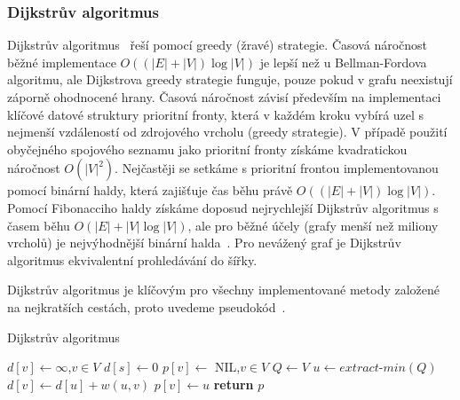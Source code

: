 \documentclass{bakalarka}
\begin{document}
\subsubsection{Dijkstrův algoritmus}
Dijkstrův algoritmus~\citep{dijkstra1959} řeší  pomocí greedy (žravé) strategie. Časová náročnost běžné implementace
$O((|E| + |V|)\log|V|)$ je lepší než u Bellman-Fordova algoritmu, ale
Dijkstrova greedy strategie funguje, pouze pokud v grafu neexistují záporně
ohodnocené hrany. Časová náročnost závisí především na implementaci klíčové
datové struktury prioritní fronty, která v každém kroku vybírá uzel s nejmenší
vzdáleností od zdrojového vrcholu (greedy strategie). V případě použití
obyčejného spojového seznamu jako prioritní fronty získáme kvadratickou
náročnost $O(|V|^2)$. Nejčastěji se setkáme s prioritní frontou implementovanou
pomocí binární haldy, která zajišťuje čas běhu právě $O((|E| + |V|)\log|V|)$.
Pomocí Fibonacciho haldy získáme doposud nejrychlejší Dijkstrův algoritmus s
časem běhu $O(|E| + |V| \log|V|)$, ale pro běžné účely (grafy menší než miliony
vrcholů) je nejvýhodnější binární halda~\citep{CLRS,fredmantarjan}. Pro
nevážený graf je Dijkstrův algoritmus ekvivalentní prohledávání do šířky.

Dijkstrův algoritmus je klíčovým pro všechny implementované metody založené na
nejkratších cestách, proto uvedeme pseudokód~\citep{CLRS}.

\begin{center}
\begin{minipage}{\textwidth}
\begin{algorithm}[H]
	\caption{Dijkstrův algoritmus}
		\label{alg:dijkstra}
	\begin{algorithmic}[1]
	\Statex
	  
		\State $d[v] \gets \infty$,$v \in V$
		\State $d[s] \gets 0$
		\State $p[v] \gets $ NIL,$v \in V$
		\State $Q \gets V$
			\State $u \gets extract\mbox{-}min(Q)$
					\State $d[v] \gets d[u] + w(u, v)$
					\State $p[v] \gets u$
				\EndIf
			\EndFor
		\EndWhile
		\State \textbf{return} $p$
	\EndFunction
	\end{algorithmic}
\end{algorithm}
\end{minipage}
\end{center}
\mbox{}
\end{document}
